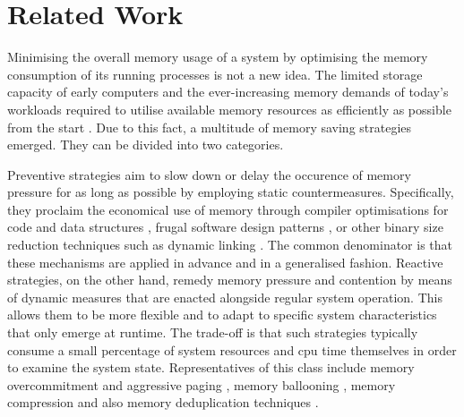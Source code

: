 \chapter{Related Work}
\label{chap:related-work}

Minimising the overall memory usage of a system by optimising the memory consumption of its running processes is not a new idea.
The limited storage capacity of early computers and the ever-increasing memory demands of today's workloads required to utilise available memory resources as efficiently as possible from the start \cite{memory-scarcity2015}.
Due to this fact, a multitude of memory saving strategies emerged.
They can be divided into two categories.

Preventive strategies aim to slow down or delay the occurence of memory pressure for as long as possible by employing static countermeasures.
Specifically, they proclaim the economical use of memory through compiler optimisations for code and data structures \cite{compiler-code-size2011}, frugal software design patterns \cite{small-software2000}, or other binary size reduction techniques such as dynamic linking \cite{osc2018}.
The common denominator is that these mechanisms are applied in advance and in a generalised fashion.
Reactive strategies, on the other hand, remedy memory pressure and contention by means of dynamic measures that are enacted alongside regular system operation.
This allows them to be more flexible and to adapt to specific system characteristics that only emerge at runtime.
The trade-off is that such strategies typically consume a small percentage of system resources and \ac{cpu} time themselves in order to examine the system state.
Representatives of this class include memory overcommitment and aggressive paging \cite{mos2009}, memory ballooning \cite{memory-ballooning2013}, memory compression and also memory deduplication techniques \cite{osc2018}.

